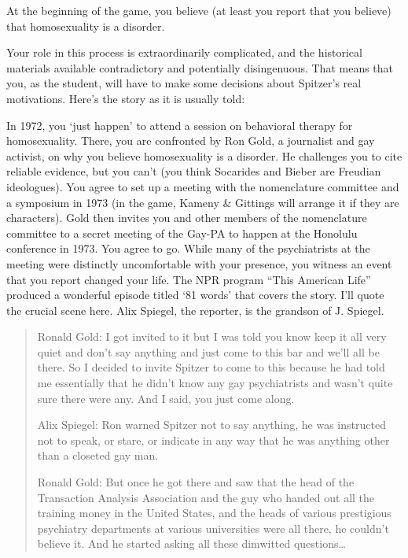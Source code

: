 \begin{refsection}
At the beginning of the game, you believe (at least you report that you believe) that homosexuality is a disorder.

Your role in this process is extraordinarily complicated, and the historical materials available contradictory and potentially disingenuous. That means that you, as the student, will have to make some decisions about Spitzer's real motivations. Here's the story as it is usually told:

In 1972, you `just happen' to attend a session on behavioral therapy for homosexuality. There, you are confronted by Ron Gold, a journalist and gay activist, on why you believe homosexuality is a disorder. He challenges you to cite reliable evidence, but you can't (you think Socarides and Bieber are Freudian ideologues). You agree to set up a meeting with the nomenclature committee and a symposium in 1973 (in the game, Kameny \& Gittings will arrange it if they are characters). Gold then invites you and other members of the nomenclature committee to a secret meeting of the Gay-PA to happen at the Honolulu conference in 1973. You agree to go. While many of the psychiatrists at the meeting were distinctly uncomfortable with your presence, you witness an event that you report changed your life. The NPR program ``This American Life'' produced a wonderful episode titled `81 words' that covers the story. I'll quote the crucial scene here. Alix Spiegel, the reporter, is the grandson of J. Spiegel.

\begin{quote}

Ronald Gold: I got invited to it but I was told you know keep it all very quiet and don't say anything and just come to this bar and we'll all be there. So I decided to invite Spitzer to come to this because he had told me essentially that he didn't know any gay psychiatrists and wasn't quite sure there were any. And I said, you just come along.

Alix Spiegel: Ron warned Spitzer not to say anything, he was instructed not to speak, or stare, or indicate in any way that he was anything other than a closeted gay man.

Ronald Gold: But once he got there and saw that the head of the Transaction Analysis Association and the guy who handed out all the training money in the United States, and the heads of various prestigious psychiatry departments at various universities were all there, he couldn't believe it. And he started asking all these dimwitted questions{\ldots}


\end{quote}
\end{refsection}
